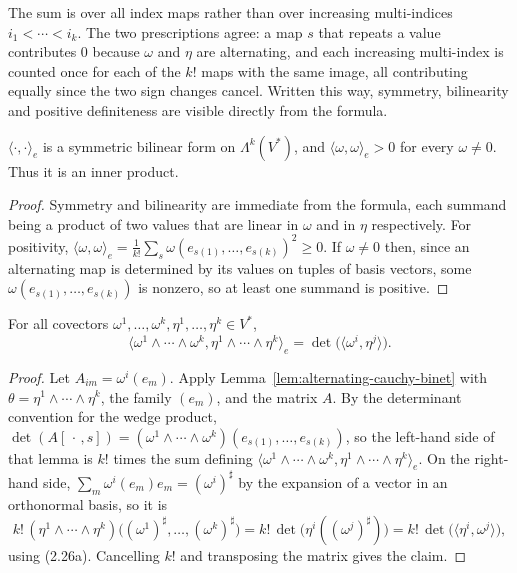 The sum is over all index maps rather than over increasing multi-indices $i_1 < \cdots < i_k$. The two prescriptions agree: a map $s$ that repeats a value contributes $0$ because $\omega$ and $\eta$ are alternating, and each increasing multi-index is counted once for each of the $k!$ maps with the same image, all contributing equally since the two sign changes cancel. Written this way, symmetry, bilinearity and positive definiteness are visible directly from the formula.

\begin{lemma}
\label{lem:inner-k-covectors-posdef}
\leanok
{}
$\langle \cdot, \cdot \rangle_e$ is a symmetric bilinear form on $\Lambda^k(V^*)$, and $\langle \omega, \omega \rangle_e > 0$ for every $\omega \ne 0$. Thus it is an inner product.
\end{lemma}
\begin{proof}
\leanok
Symmetry and bilinearity are immediate from the formula, each summand being a product of two values that are linear in $\omega$ and in $\eta$ respectively. For positivity, $\langle \omega, \omega \rangle_e = \frac{1}{k!}\sum_s \omega(e_{s(1)},\ldots,e_{s(k)})^2 \ge 0$. If $\omega \ne 0$ then, since an alternating map is determined by its values on tuples of basis vectors, some $\omega(e_{s(1)},\ldots,e_{s(k)})$ is nonzero, so at least one summand is positive.
\end{proof}

\begin{lemma}
\label{lem:inner-k-covectors-wedge}
\leanok
{}
For all covectors $\omega^1, \ldots, \omega^k, \eta^1, \ldots, \eta^k \in V^*$,
\[
\langle \omega^1 \wedge \cdots \wedge \omega^k, \eta^1 \wedge \cdots \wedge \eta^k \rangle_e = \det\big(\langle \omega^i, \eta^j \rangle\big).
\]
\end{lemma}
\begin{proof}
\leanok
{}
Let $A_{im} = \omega^i(e_m)$. Apply Lemma~\ref{lem:alternating-cauchy-binet} with $\theta = \eta^1 \wedge \cdots \wedge \eta^k$, the family $(e_m)$, and the matrix $A$. By the determinant convention for the wedge product, $\det(A[\,\cdot\,, s]) = (\omega^1 \wedge \cdots \wedge \omega^k)(e_{s(1)},\ldots,e_{s(k)})$, so the left-hand side of that lemma is $k!$ times the sum defining $\langle \omega^1 \wedge \cdots \wedge \omega^k, \eta^1 \wedge \cdots \wedge \eta^k \rangle_e$. On the right-hand side, $\sum_m \omega^i(e_m)e_m = (\omega^i)^\sharp$ by the expansion of a vector in an orthonormal basis, so it is
\[
k!\,(\eta^1 \wedge \cdots \wedge \eta^k)\big((\omega^1)^\sharp, \ldots, (\omega^k)^\sharp\big) = k!\,\det\big(\eta^i((\omega^j)^\sharp)\big) = k!\,\det\big(\langle \eta^i, \omega^j\rangle\big),
\]
using (2.26a). Cancelling $k!$ and transposing the matrix gives the claim.
\end{proof}


